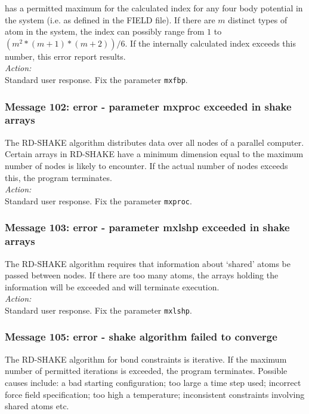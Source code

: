 \D{} has a permitted maximum for the calculated index for any
four body potential in the system (i.e. as defined in the FIELD
file). If there are $m$ distinct types of atom in the system, the
index can possibly range from $1$ to $(m^{2}*(m+1)*(m+2))/6$. If the
internally calculated index exceeds this number, this error report
results. \\

\noindent
{\em Action:} \\
Standard user response. Fix the parameter {\tt mxfbp}.

\subsubsection*{Message 102: error - parameter mxproc exceeded in shake arrays}

The RD-SHAKE algorithm  distributes data over all nodes of a parallel
computer. Certain arrays in RD-SHAKE have a minimum dimension equal to
the maximum number of nodes \D{} is likely to encounter. If the
actual number of nodes exceeds this, the program terminates. \\ 

\noindent
{\em Action:} \\ 
Standard user response. Fix the parameter {\tt mxproc}.

\subsubsection*{Message 103: error - parameter mxlshp exceeded in shake arrays}

The RD-SHAKE algorithm requires that information about `shared' atoms
be passed between nodes. If there are too many atoms, the arrays
holding the information will be exceeded and \D{} will terminate
execution. \\ 

\noindent
{\em Action:} \\ 
Standard user response. Fix the parameter {\tt mxlshp}.

\subsubsection*{Message 105: error - shake algorithm failed to converge}

The RD-SHAKE  algorithm for bond
constraints   is iterative. If the
maximum number of permitted iterations is exceeded, the program
terminates. Possible causes include: a bad starting configuration; too
large a time step used; incorrect force field  specification; too high
a temperature; inconsistent constraints involving shared atoms etc. \\ 

